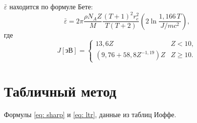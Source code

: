\documentclass[a4paper,12pt]{article} %
\newcommand{\eps}{\varepsilon}
\begin{document}
$\bar{\eps}$ находится по формуле Бете:
\begin{equation}
    \bar{\eps} =
    2 \pi \frac{\rho N_AZ}{M}
    \frac{(T+1)^2 r_e^2}{T(T+2)}
    \left(
        2 \ln
        \frac{1{,}166\,T}{J/mc^2}
    \right),
\end{equation}
где
\begin{equation}
    J [\text{эВ}] =
    \begin{cases}
        13{,}6 Z & Z<10, \\
        (9{,}76 + 58{,}8 Z^{-1{,}19}) Z & Z\geqslant 10.
    \end{cases}
\end{equation}

\section{Табличный метод}

Формулы \eqref{eq: sharp} и \eqref{eq: ltr}, данные из таблиц Иоффе.
\end{document}
